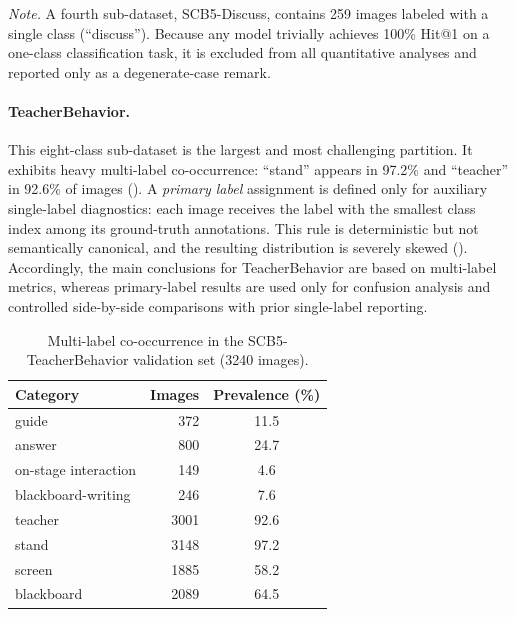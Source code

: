 \documentclass[electronics,article,submit,pdftex,moreauthors]{Definitions/mdpi}
\begin{document}
\noindent\textit{Note.} A fourth sub-dataset, SCB5-Discuss, contains 259 images labeled with a single class (``discuss''). Because any model trivially achieves 100\% Hit@1 on a one-class classification task, it is excluded from all quantitative analyses and reported only as a degenerate-case remark.

\paragraph{TeacherBehavior.}
This eight-class sub-dataset is the largest and most challenging partition.
It exhibits heavy multi-label co-occurrence: ``stand'' appears in 97.2\% and ``teacher'' in 92.6\% of images ().
A \emph{primary label} assignment is defined only for auxiliary single-label diagnostics: each image receives the label with the smallest class index among its ground-truth annotations.
This rule is deterministic but not semantically canonical, and the resulting distribution is severely skewed (). Accordingly, the main conclusions for TeacherBehavior are based on multi-label metrics, whereas primary-label results are used only for confusion analysis and controlled side-by-side comparisons with prior single-label reporting.

\begin{table}[H]
\caption{Multi-label co-occurrence in the SCB5-TeacherBehavior validation set (3240 images).}
\label{tab:dataset_multi}
\centering
\begin{tabular}{lrc}
\toprule
\textbf{Category} & \textbf{Images} & \textbf{Prevalence (\%)} \\
\midrule
guide & 372 & 11.5 \\
answer & 800 & 24.7 \\
on-stage interaction & 149 & 4.6 \\
blackboard-writing & 246 & 7.6 \\
teacher & 3001 & 92.6 \\
stand & 3148 & 97.2 \\
screen & 1885 & 58.2 \\
blackboard & 2089 & 64.5 \\
\bottomrule
\end{tabular}
\end{table}
\end{document}
